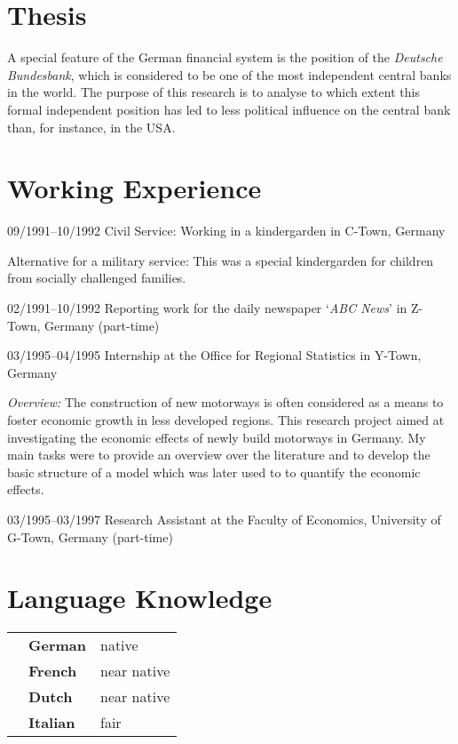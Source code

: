 \documentclass[a4paper]{article}
\begin{document}
\pagebreak

\section{Thesis}
\noindent A special feature of the German financial system is the position of
the \emph{Deutsche Bundesbank}, which is considered to be one of the
most independent central banks in the world. The purpose of this
research is to analyse to which extent this formal independent
position has led to less political influence on the central
bank than, for instance, in the USA.

\section{Working Experience}

\begin{CV}

\item[09/1991--10/1992] Civil Service: Working in a
  kindergarden in C-Town, Germany

  Alternative for a military service: This was a special kindergarden for children from
  socially challenged families.

\item[02/1991--10/1992] Reporting work for the daily newspaper
  `\emph{ABC News}' in Z-Town, Germany (part-time)

\item[03/1995--04/1995] Internship at the Office for Regional
  Statistics in Y-Town, Germany

  \emph{Overview:} The construction of new motorways is often
  considered as a means to foster economic growth in less developed
  regions. This research project aimed at investigating the economic
  effects of newly build motorways in Germany. My main tasks were to
  provide an overview over the literature and to develop the basic
  structure of a model which was later used to to quantify the
  economic effects.


\item[03/1995--03/1997] Research Assistant at the Faculty of
  Economics, University of G-Town, Germany (part-time)

\end{CV}


\section{Language Knowledge}
\begin{table}[h] %
\begin{tabular}{p{2cm}>{\bfseries}p{2.5cm}p{3cm}}
& German  & native \\
& French  & near native \\
& Dutch & near native\\
& Italian & fair \\
\end{tabular}
\end{table}
\end{document}
